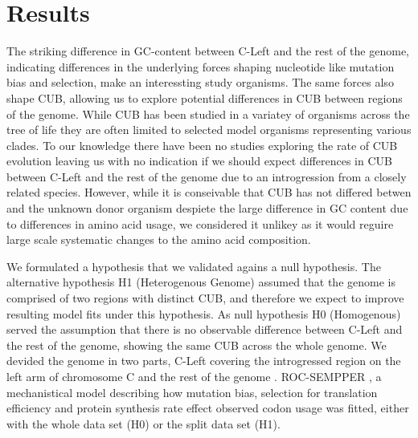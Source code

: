 \documentclass[12pt]{article}
\begin{document}
\section*{Results}
The striking difference in GC-content between C-Left and the rest of the \kluyveri genome, indicating differences in the underlying forces shaping nucleotide like mutation bias and selection, make \kluyveri an interessting study organisms. 
The same forces also shape CUB, allowing us to explore potential differences in CUB between regions of the \kluyveri genome.
While CUB has been studied in a variatey of organisms across the tree of life they are often limited to selected model organisms representing various clades.
To our knowledge there have been no studies exploring the rate of CUB evolution leaving us with no indication if we should expect differences in CUB between C-Left and the rest of the \kluyveri genome due to an introgression from a closely related species.
However, while it is conseivable that CUB has not differed betwen \kluyveri and the unknown donor organism despiete the large difference in GC content due to differences in amino acid usage, we considered it unlikey as it would reguire large scale systematic changes to the amino acid composition.

We formulated a hypothesis that we validated agains a null hypothesis. 
The alternative hypothesis H1 (Heterogenous Genome) assumed that the \kluyveri genome is comprised of two regions with distinct CUB, and therefore we expect to improve resulting model fits under this hypothesis. 
As null hypothesis H0 (Homogenous) served the assumption that there is no observable difference between C-Left and the rest of the \kluyveri genome, showing the same CUB across the whole genome.
We devided the \kluyveri genome in two parts, C-Left covering the introgressed region on the left arm of chromosome C and the rest of the \kluyveri genome \citep{payen2009}.
ROC-SEMPPER \citep{gilchrist2015}, a mechanistical model describing how mutation bias, selection for translation efficiency and protein synthesis rate effect observed codon usage was fitted, either with the whole data set (H0) or the split data set (H1).
\end{document}
